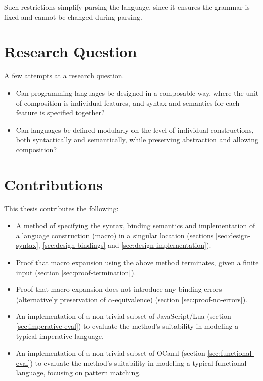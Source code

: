 \documentclass{kththesis}
\begin{document}
Such restrictions simplify parsing the language, since it ensures the grammar is fixed and cannot be changed during parsing.

\section{Research Question}

A few attempts at a research question.

\begin{itemize}
\item Can programming languages be designed in a composable way, where the unit of composition is individual features, and syntax and semantics for each feature is specified together?

\item Can languages be defined modularly on the level of individual constructions, both syntactically and semantically, while preserving abstraction and allowing composition?
\end{itemize}

\section{Contributions}

This thesis contributes the following:

\begin{itemize}
  \item A method of specifying the syntax, binding semantics and implementation of a language construction (macro) in a singular location (sections \ref{sec:design-syntax}, \ref{sec:design-bindings} and \ref{sec:design-implementation}).
  \item Proof that macro expansion using the above method terminates, given a finite input (section \ref{sec:proof-termination}).
  \item Proof that macro expansion does not introduce any binding errors (alternatively preservation of $\alpha$-equivalence) (section \ref{sec:proof-no-errors}).
  \item An implementation of a non-trivial subset of JavaScript/Lua (section \ref{sec:imperative-eval}) to evaluate the method's suitability in modeling a typical imperative language.
  \item An implementation of a non-trivial subset of OCaml (section \ref{sec:functional-eval}) to evaluate the method's suitability in modeling a typical functional language, focusing on pattern matching.
\end{itemize}
\end{document}
